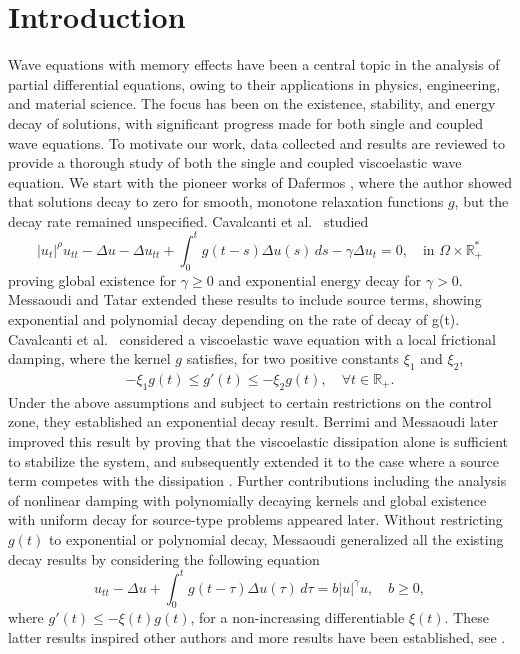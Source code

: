 \documentclass[10pt,a4paper]{amsart}
\numberwithin{equation}{section}
\begin{document}
 \section{Introduction}
 
 Wave equations with memory effects have been a central topic in the analysis of partial
 differential equations, owing to their applications in physics, engineering, and material
 science. The focus has been on the existence, stability, and energy decay of solutions, with significant progress made for both single and coupled wave equations.
 To motivate our work, data collected and results are reviewed to provide a thorough study of
 both the single and coupled viscoelastic wave equation. We start with the pioneer works of Dafermos \cite{Dafermos1, Dafermos2}, where the author showed that solutions decay to zero
 for smooth, monotone relaxation functions $g$, but the decay rate remained unspecified. Cavalcanti et al.\ \cite{CavalcantiDS} studied
\[
|u_t|^\rho u_{tt} - \Delta u - \Delta u_{tt} + \int_0^t g(t - s) \Delta u(s) \, ds - \gamma \Delta u_t = 0,\quad \text{in } \Omega \times \mathbb{R}^{*}_{+}
\]
proving global existence for $\gamma \geq 0$ and exponential energy decay for $\gamma > 0$. Messaoudi and Tatar \cite{MTatar1, MTatar2} extended these results to include source terms, showing exponential and polynomial decay depending on the rate of decay of g(t).
Cavalcanti et al.\ \cite{CavalcantiFerreira} considered a viscoelastic wave equation with a
local frictional damping, where the kernel $g$ satisfies, for two positive constants $\xi_1$
and $\xi_2$,
\begin{align*}
-\xi_1 g(t) \leq g'(t) \leq -\xi_2 g(t), \quad \forall t \in \mathbb{R}_{+}.
\end{align*}
Under the above assumptions and subject to certain restrictions on the control zone, they established an exponential decay result. Berrimi and Messaoudi \cite{Berrimi2004} later
improved this result by proving that the viscoelastic dissipation alone is sufficient to stabilize the system, and subsequently extended it to the case where a source term competes with the dissipation \cite{Berrimi2006}.
Further contributions including the analysis of nonlinear damping with polynomially decaying kernels \cite{Cavalcanti2003} and global existence with uniform decay for source-type problems \cite{Li2011}  appeared later.
 Without restricting $g(t)$ to exponential or polynomial decay, Messaoudi \cite{SMessaoudi1, SMessaoudi2} generalized all the existing decay results by considering the following equation
\[
u_{tt} - \Delta u + \int_0^t g(t - \tau) \Delta u(\tau) \, d\tau = b |u|^{\gamma} u,\quad b \geq 0,
\]
where $g'(t) \leq -\xi(t) g(t)$, for a non-increasing differentiable $\xi(t)$.
These latter results inspired other authors and more results have been established, see \cite{SaidH2011, Hao, PJS, WSH, MessaoudiMustafa}.
\end{document}
